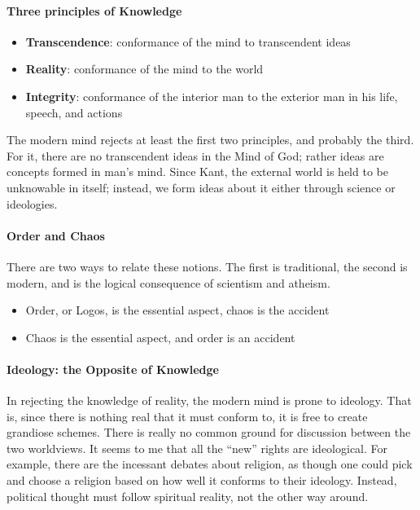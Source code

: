 \paragraph{Three principles of Knowledge}


\begin{itemize}
\item \textbf{Transcendence}: conformance of the mind to transcendent ideas
\item \textbf{Reality}: conformance of the mind to the world
\item \textbf{Integrity}: conformance of the interior man to the exterior man in his life, speech, and actions
\end{itemize}


The modern mind rejects at least the first two principles, and probably the third. For it, there are no transcendent ideas in the Mind of God; rather ideas are concepts formed in man's mind. Since Kant, the external world is held to be unknowable in itself; instead, we form ideas about it either through science or ideologies.

\paragraph{Order and Chaos}


There are two ways to relate these notions. The first is traditional, the second is modern, and is the logical consequence of scientism and atheism.

\begin{itemize}
\item Order, or Logos, is the essential aspect, chaos is the accident
\item Chaos is the essential aspect, and order is an accident
\end{itemize}


\paragraph{Ideology: the Opposite of Knowledge}


In rejecting the knowledge of reality, the modern mind is prone to ideology. That is, since there is nothing real that it must conform to, it is free to create grandiose schemes. There is really no common ground for discussion between the two worldviews. It seems to me that all the ``new'' rights are ideological. For example, there are the incessant debates about religion, as though one could pick and choose a religion based on how well it conforms to their ideology. Instead, political thought must follow spiritual reality, not the other way around.


